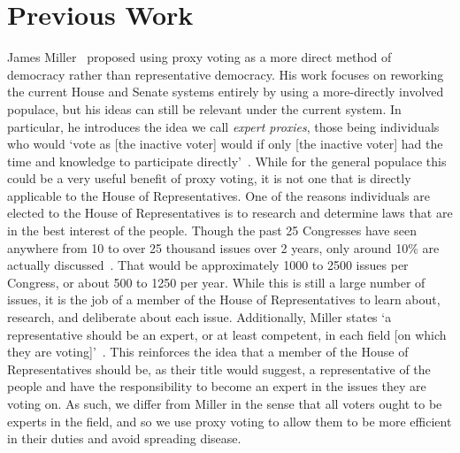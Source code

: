 \section{Previous Work}\label{sec:previous-work}
James Miller~\cite{Miller1969} proposed using proxy voting as a more direct method of
democracy rather than representative democracy.
His work focuses on reworking the current House and Senate systems entirely by using a
more-directly involved populace, but his ideas can still be relevant under the current
system.
In particular, he introduces the idea we call \textit{expert proxies},
those being individuals who would `vote as [the inactive voter] would if only
[the inactive voter] had the time and knowledge to participate
directly'~\cite{Miller1969}.
While for the general populace this could be a very useful benefit of proxy voting,
it is not one that is directly applicable to the House of Representatives.
One of the reasons individuals are elected to the House of Representatives is to
research and determine laws that are in the best interest of the people.
Though the past 25 Congresses have seen anywhere from 10 to over 25 thousand issues
over 2 years, only around 10\% are actually discussed~\cite{GovTrack2022}.
That would be approximately 1000 to 2500 issues per Congress, or about 500 to 1250 per
year.
While this is still a large number of issues, it is the job of a member of the House
of Representatives to learn about, research, and deliberate about each issue.
Additionally, Miller states `a representative should be an expert, or at least
competent, in each field [on which they are voting]'~\cite{Miller1969}.
This reinforces the idea that a member of the House of Representatives should be, as
their title would suggest, a representative of the people and have the responsibility
to become an expert in the issues they are voting on.
As such, we differ from Miller in the sense that all voters ought to be experts in
the field, and so we use proxy voting to allow them to be more efficient in their
duties and avoid spreading disease.


